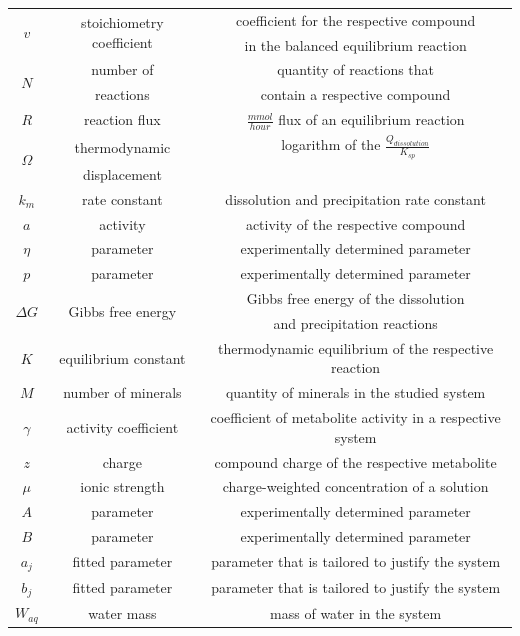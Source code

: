 \begin{supplementary}
\begin{longtable}{c|c|c}
    \multirow{2}{1em}{$v$} & \multirow{2}{3em}{stoichiometry coefficient} & coefficient for the respective compound \\& & in the balanced equilibrium reaction \\ \midrule
    \multirow{2}{1em}{$N$} & number of & quantity of reactions that \\& reactions & contain a respective compound \\ \midrule
    $R$ & reaction flux & $\frac{mmol}{hour}$ flux of an equilibrium reaction \\ \midrule
    \multirow{2}{1em}{$\Omega$} & thermodynamic & logarithm of the $\frac{Q_{dissolution}}{K_{sp}}$ \\& displacement & \\ \midrule
    $k_m$ & rate constant & dissolution and precipitation rate constant \\ \midrule
    $a$ & activity & activity of the respective compound \\ \midrule
    $\eta$ & parameter & experimentally determined parameter \\ \midrule
    $p$ & parameter & experimentally determined parameter \\ \midrule
    \multirow{2}{2em}{$\Delta G$} & \multirow{2}{5em}{Gibbs free energy} & Gibbs free energy of the dissolution \\& & and precipitation reactions \\ \midrule
    $K$ & equilibrium constant & thermodynamic equilibrium of the respective reaction \\ \midrule
    $M$ & number of minerals & quantity of minerals in the studied system \\ \midrule
    $\gamma$ & activity coefficient & coefficient of metabolite activity in a respective system \\ \midrule
    $z$ & charge & compound charge of the respective metabolite \\ \midrule
    $\mu$ & ionic strength & charge-weighted concentration of a solution \\ \midrule
    $A$ & parameter & experimentally determined parameter \\ \midrule
    $B$ & parameter & experimentally determined parameter \\ \midrule
    $a_j$ & fitted parameter & parameter that is tailored to justify the system \\ \midrule
    $b_j$ & fitted parameter & parameter that is tailored to justify the system \\ \midrule
    $W_{aq}$ & water mass & mass of water in the system \\ \bottomrule
\end{longtable} 


\end{supplementary}
